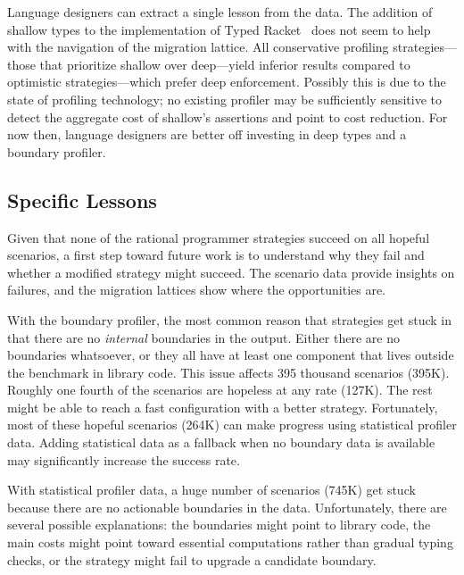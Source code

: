 Language designers can extract a single lesson from the data.  The addition of
shallow types to the implementation of Typed Racket~\cite{g-deep-shallow} does
not seem to help with the navigation of the migration lattice. All conservative
profiling strategies---those that prioritize shallow over deep---yield inferior
results compared to optimistic strategies---which prefer deep
enforcement. Possibly this is due to the state of profiling technology; no
existing profiler may be sufficiently sensitive to detect the aggregate cost of
shallow's assertions and point to cost reduction.  For now then, language
designers are better off investing in deep types and a boundary profiler.




\subsection{Specific Lessons}
\label{s:specific-lessons}

Given that none of the rational programmer strategies
succeed on all hopeful scenarios, a first step toward
future work is to understand why they fail and whether
a modified strategy might succeed.
The scenario data provide insights on failures,
and the migration lattices show where the opportunities are.

With the boundary profiler, the most common reason
that strategies get stuck in that there are no
\emph{internal} boundaries in the output.
Either there are no boundaries whatsoever, or they all have at least one
component that lives outside the benchmark in library code.
This issue affects 395 thousand scenarios (395K).
Roughly one fourth of the scenarios are hopeless at any rate (127K).
The rest might be able to reach a fast configuration with a better strategy.
Fortunately, most of these hopeful scenarios (264K) can make progress
using statistical profiler data.
Adding statistical data as a fallback when no boundary data is available
may significantly increase the success rate.

With statistical profiler data, a huge number of scenarios (745K) get stuck
because there are no actionable boundaries in the data.
Unfortunately, there are several possible explanations:
the boundaries might point to library code, the main costs might point toward
essential computations rather than gradual typing checks, or the strategy
might fail to upgrade a candidate boundary.

